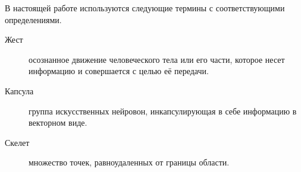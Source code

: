 \Defines %
В настоящей работе используются следующие термины с соответствующими определениями.
\begin{description}
	\item [Жест] осознанное движение человеческого тела или его части, которое несет информацию и совершается с целью её передачи.
	\item[Капсула] группа искусственных нейровон, инкапсулирующая в себе информацию в векторном виде.
	\item[Скелет] множество точек, равноудаленных от границы области.


\end{description}
